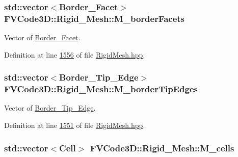 \subsubsection[{\texorpdfstring{M\+\_\+border\+Facets}{M_borderFacets}}]{\setlength{\rightskip}{0pt plus 5cm}std\+::vector$<${\bf Border\+\_\+\+Facet}$>$ F\+V\+Code3\+D\+::\+Rigid\+\_\+\+Mesh\+::\+M\+\_\+border\+Facets\hspace{0.3cm}{\ttfamily [protected]}}\hypertarget{classFVCode3D_1_1Rigid__Mesh_a21700f8c7b816da944a829ee9d3ab7fb}{}\label{classFVCode3D_1_1Rigid__Mesh_a21700f8c7b816da944a829ee9d3ab7fb}


Vector of \hyperlink{classFVCode3D_1_1Rigid__Mesh_1_1Border__Facet}{Border\+\_\+\+Facet}. 



Definition at line \hyperlink{RigidMesh_8hpp_source_l01556}{1556} of file \hyperlink{RigidMesh_8hpp_source}{Rigid\+Mesh.\+hpp}.

\subsubsection[{\texorpdfstring{M\+\_\+border\+Tip\+Edges}{M_borderTipEdges}}]{\setlength{\rightskip}{0pt plus 5cm}std\+::vector$<${\bf Border\+\_\+\+Tip\+\_\+\+Edge}$>$ F\+V\+Code3\+D\+::\+Rigid\+\_\+\+Mesh\+::\+M\+\_\+border\+Tip\+Edges\hspace{0.3cm}{\ttfamily [protected]}}\hypertarget{classFVCode3D_1_1Rigid__Mesh_a712ea50f5237025e92af21799c5ec31b}{}\label{classFVCode3D_1_1Rigid__Mesh_a712ea50f5237025e92af21799c5ec31b}


Vector of \hyperlink{classFVCode3D_1_1Rigid__Mesh_1_1Border__Tip__Edge}{Border\+\_\+\+Tip\+\_\+\+Edge}. 



Definition at line \hyperlink{RigidMesh_8hpp_source_l01551}{1551} of file \hyperlink{RigidMesh_8hpp_source}{Rigid\+Mesh.\+hpp}.

\subsubsection[{\texorpdfstring{M\+\_\+cells}{M_cells}}]{\setlength{\rightskip}{0pt plus 5cm}std\+::vector$<${\bf Cell}$>$ F\+V\+Code3\+D\+::\+Rigid\+\_\+\+Mesh\+::\+M\+\_\+cells\hspace{0.3cm}{\ttfamily [protected]}}\hypertarget{classFVCode3D_1_1Rigid__Mesh_ad19dc70b4efddafb6e8d8d4980bd23d6}{}\label{classFVCode3D_1_1Rigid__Mesh_ad19dc70b4efddafb6e8d8d4980bd23d6}


